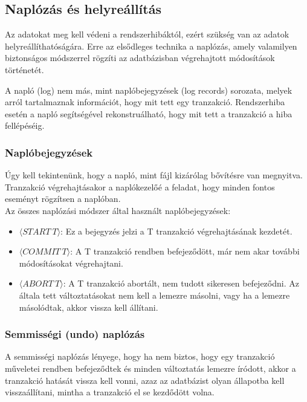 \documentclass[margin=0px]{article}
\begin{document}
	\subsection{Naplózás és helyreállítás}
	
	Az adatokat meg kell védeni a rendszerhibáktól, ezért szükség van az adatok helyreállíthatóságára. Erre az elsődleges
	technika a naplózás, amely valamilyen biztonságos módszerrel rögzíti az adatbázisban végrehajtott módosítások történetét.
	
	A napló (log) nem más, mint naplóbejegyzések (log records) sorozata, melyek arról tartalmaznak információt, hogy mit tett
	egy tranzakció. Rendszerhiba esetén a napló segítségével rekonstruálható, hogy mit tett a tranzakció a hiba fellépéséig.
	
	\subsubsection{Naplóbejegyzések}
	
	Úgy kell tekintenünk, hogy a napló, mint fájl kizárólag bővítésre van megnyitva. Tranzakció végrehajtásakor a naplókezelőé
	a feladat, hogy minden fontos eseményt rögzítsen a naplóban.\\
	
	\noindent Az összes naplózási módszer által használt naplóbejegyzések:
	\begin{itemize}
		\item	$\langle START \ T \rangle$: Ez a bejegyzés jelzi a T tranzakció végrehajtásának kezdetét.
		\item	$\langle COMMIT \ T \rangle$: A T tranzakció rendben befejeződött, már nem akar további módosításokat végrehajtani. 
		\item	$\langle ABORT \ T \rangle$: A T tranzakció abortált, nem tudott sikeresen befejeződni. Az általa tett változtatásokat
		nem kell a lemezre másolni, vagy ha a lemezre másolódtak, akkor vissza kell állítani.
	\end{itemize}
	
	\subsubsection{Semmisségi (undo) naplózás}
	
	A semmisségi naplózás lényege, hogy ha nem biztos, hogy egy tranzakció műveletei rendben befejeződtek és minden változtatás
	lemezre íródott, akkor a tranzakció hatását vissza kell vonni, azaz az adatbázist olyan állapotba kell visszaállítani,
	mintha a tranzakció el se kezdődött volna.
	
\end{document}
